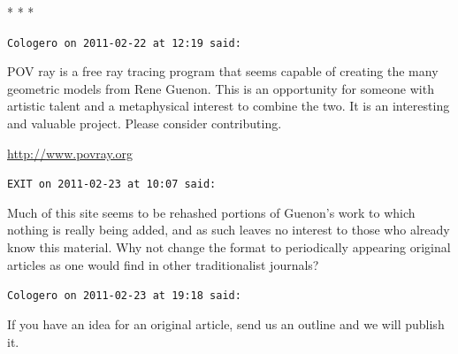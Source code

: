 
\begin{center}* * *\end{center}

\begin{footnotesize}
\begin{sffamily}
\texttt{Cologero on 2011-02-22 at 12:19 said:}

POV ray is a free ray tracing program that seems capable of creating the many geometric models from Rene Guenon. This is an opportunity for someone with artistic talent and a metaphysical interest to combine the two. It is an interesting and valuable project. Please consider contributing.

\url{http://www.povray.org}


\hfill

\texttt{EXIT on 2011-02-23 at 10:07 said:}

Much of this site seems to be rehashed portions of Guenon's work to which nothing is really being added, and as such leaves no interest to those who already know this material. Why not change the format to periodically appearing original articles as one would find in other traditionalist journals?

\hfill

\texttt{Cologero on 2011-02-23 at 19:18 said:}

If you have an idea for an original article, send us an outline and we will publish it.


\hfill

\end{sffamily}
\end{footnotesize}

